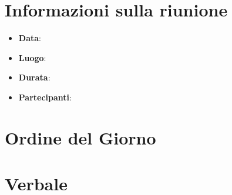 \section{Informazioni sulla riunione}
\begin{itemize}
	\item \textbf{Data}: \data
	\item \textbf{Luogo}:\ \luogo
	\item \textbf{Durata}: \durata
	\item \textbf{Partecipanti}: \partecipanti
\end{itemize}
\section{Ordine del Giorno}
\ordineDelGiorno

\section{Verbale}
\contenuto